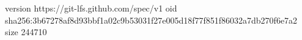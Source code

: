 version https://git-lfs.github.com/spec/v1
oid sha256:3b67278af8d93bbf1a02c9b53031f27e005d18f77f851f86032a7db270f6e7a2
size 244710
